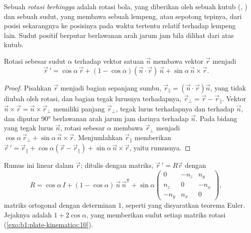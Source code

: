 \begin{definition}\label{def:b1:plate-kinematics:finite-rotation}
Sebuah \emph{rotasi berhingga} adalah rotasi bola, yang diberikan oleh sebuah kutub (, ) dan sebuah sudut, yang membawa sebuah lempeng, atau sepotong tepinya, dari posisi sekarangnya ke posisinya pada waktu tertentu relatif terhadap lempeng lain. Sudut positif berputar berlawanan arah jarum jam bila dilihat dari atas kutub.
\end{definition}

\begin{proposition}\label{prop:b1:plate-kinematics:rodrigues}
Rotasi sebesar sudut $\alpha$ terhadap vektor satuan $\vec n$ membawa vektor
$\vec r$ menjadi
\[
  \vec r\,' = \cos\alpha\,\vec r + (1 - \cos\alpha)(\vec n\cdot\vec r)\,\vec n
  + \sin\alpha\,\vec n\times\vec r .
\]
\end{proposition}

\begin{proof}
Pisahkan $\vec r$ menjadi bagian sepanjang sumbu, $\vec r_\parallel =
(\vec n\cdot\vec r)\vec n$, yang tidak diubah oleh rotasi, dan bagian tegak lurusnya
terhadapnya, $\vec r_\perp = \vec r - \vec r_\parallel$. Vektor
$\vec n\times\vec r = \vec n\times\vec r_\perp$ memiliki panjang $\vec r_\perp$,
tegak lurus terhadapnya dan terhadap $\vec n$, dan diputar \ang{90} berlawanan arah jarum jam darinya terhadap $\vec n$. Pada bidang yang tegak lurus $\vec n$, rotasi sebesar
$\alpha$ membawa $\vec r_\perp$ menjadi $\cos\alpha\,\vec r_\perp +
\sin\alpha\,\vec n\times\vec r$. Menjumlahkan $\vec r_\parallel$ memberikan $\vec r\,' =
\vec r_\parallel + \cos\alpha(\vec r - \vec r_\parallel) + \sin\alpha\,
\vec n\times\vec r$, yaitu rumusnya.
\end{proof}

Rumus ini linear dalam $\vec r$; ditulis dengan matriks, $\vec r\,' = R\vec r$
dengan
\[
  R = \cos\alpha\,I + (1 - \cos\alpha)\,\vec n\,\vec n^{\mathsf T}
  + \sin\alpha
  \begin{pmatrix} 0 & -n_z & n_y\\ n_z & 0 & -n_x\\ -n_y & n_x & 0\end{pmatrix},
\]
matriks ortogonal dengan determinan $1$, seperti yang disyaratkan teorema Euler. Jejaknya adalah $1 + 2\cos\alpha$, yang memberikan sudut setiap matriks rotasi (\cref{exo:b1:plate-kinematics:10}).

